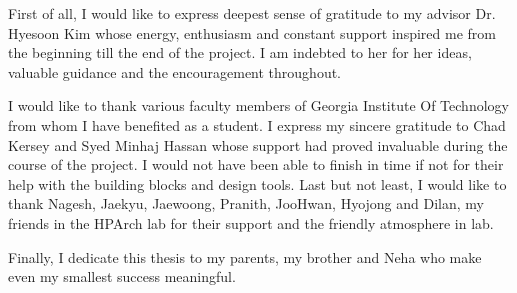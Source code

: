 \setcounter{equation}{0}
First of all, I would like to express deepest sense of gratitude to my advisor Dr. Hyesoon Kim whose energy, enthusiasm and constant support inspired me from the beginning till the end of the project. I am indebted to her for her ideas, valuable guidance and the encouragement throughout. 

I would like to thank various faculty members of Georgia Institute Of Technology from whom I have benefited as a student. 
I express my sincere gratitude to Chad Kersey and Syed Minhaj Hassan whose support had proved invaluable during the course of the project. I would not have been able to finish in time if not for their help with the building blocks and design tools. Last but not least, I would like to thank Nagesh, Jaekyu, Jaewoong, Pranith, JooHwan, Hyojong and Dilan, my friends in the HPArch lab for their support and the friendly atmosphere in lab. 

Finally, I dedicate this thesis to my parents, my brother and Neha who make even my smallest success meaningful.
